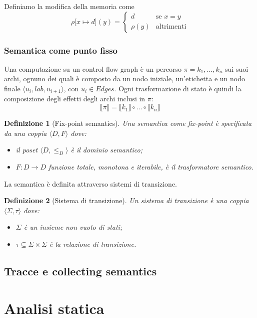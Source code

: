 \documentclass[a4paper, 10pt]{article}
\newtheorem{definit}{Definizione}[subsection]
\begin{document}
	Definiamo la modifica della memoria come \[ \rho \lbrack x \mapsto d \rbrack (y) = \begin{cases}
	d &\text{se } x = y \\
	\rho(y) &\text{altrimenti}
	\end{cases} \]
	
	\subsubsection{Semantica come punto fisso}
	
	Una computazione su un control flow graph è un percorso $\pi = k_1, ..., k_n$ sui suoi archi, ognuno dei quali è composto da un nodo iniziale, un'etichetta e un nodo finale $\langle u_i, lab, u_{i+1} \rangle$, con $u_i \in Edges$. Ogni trasformazione di stato è quindi la composizione degli effetti degli archi inclusi in $\pi$:
	\[ \llbracket \pi \rrbracket = \llbracket  k_1 \rrbracket \circ \dots \circ \llbracket k_n \rrbracket \]
	
	\begin{definit}[Fix-point semantics]
		Una semantica come fix-point è specificata da una coppia $\langle D,F \rangle$ dove: \begin{itemize}
		\item il poset $\langle D, \leq_D \rangle $ è il dominio semantico; 
		\item $F: D \to D $ funzione totale, monotona e iterabile, è il trasformatore semantico.
	\end{itemize}
	\end{definit}

	La semantica è definita attraverso sistemi di transizione.
	\begin{definit}[Sistema di transizione]
		Un sistema di transizione è una coppia $\langle \Sigma, \tau \rangle$ dove: \begin{itemize}
			\item $\Sigma$ è un insieme non vuoto di stati;
			\item $\tau \subseteq \Sigma \times \Sigma$ è la relazione di transizione.
		\end{itemize}
	\end{definit}

	\subsection{Tracce e collecting semantics}


	\newpage
	\section{Analisi statica}
	
\end{document}

